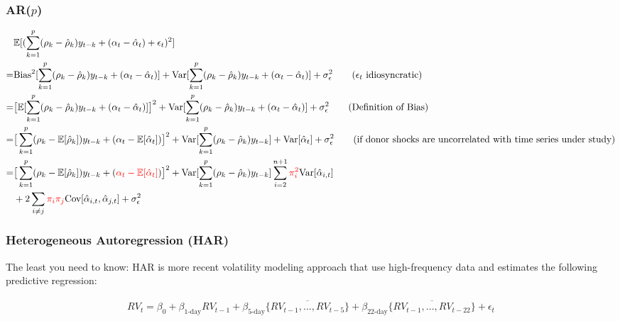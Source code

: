 \documentclass[9pt]{beamer}
\def\E{\mathbb{E}} %
\theoremstyle{definition}
\begin{document}
\begin{frame}\frametitle{AR($p$)}
      \begin{align*}
        &\E[(\sum^{p}_{k=1}(\rho_{k}-\hat\rho_{k})y_{t-k} + (\alpha_{t} - \hat{\alpha}_{t}) + \epsilon_{t} )^{2}]\notag\\
        = &\text{Bias}^{2}[\sum^{p}_{k=1}(\rho_{k}-\hat\rho_{k})y_{t-k} + (\alpha_{t} - \hat{\alpha}_{t}) ] + \text{Var}[\sum^{p}_{k=1}(\rho_{k}-\hat\rho_{k})y_{t-k} + (\alpha_{t} - \hat{\alpha}_{t}) ] + \sigma^{2}_{\epsilon}\tag{$\epsilon_{t}$ idiosyncratic}\\
        = &\big[\E[\sum^{p}_{k=1}(\rho_{k}-\hat\rho_{k})y_{t-k} + (\alpha_{t} - \hat{\alpha}_{t}) ]\big]^{2} + \text{Var}[\sum^{p}_{k=1}(\rho_{k}-\hat\rho_{k})y_{t-k} + (\alpha_{t} - \hat{\alpha}_{t})]  + \sigma^{2}_{\epsilon}\tag{Definition of Bias}\\
        = &\big[\sum^{p}_{k=1}(\rho_{k}-\E[\hat\rho_{k}])y_{t-k} + (\alpha_{t} - \E[\hat{\alpha}_{t}]) \big]^{2} + \text{Var}[\sum^{p}_{k=1}(\rho_{k}-\hat\rho_{k})y_{t-k}] + \text{Var}[\hat{\alpha}_{t}]  + \sigma^{2}_{\epsilon}\tag{if donor shocks are uncorrelated with time series under study}\\
        = &\big[\sum^{p}_{k=1}(\rho_{k}-\E[\hat\rho_{k}])y_{t-k} + (\textcolor{red}{\alpha_{t} - \E[\hat{\alpha}_{t}]}) \big]^{2} + \text{Var}[\sum^{p}_{k=1}(\rho_{k}-\hat\rho_{k})y_{t-k}] 
        \sum_{i=2}^{n+1}\textcolor{red}{\pi_{i}^{2}}\text{Var}[\hat\alpha_{i,t}] \\
        & + 2\sum_{i\neq j}\textcolor{red}{\pi_{i}\pi_{j}}\text{Cov}[\hat\alpha_{i,t},\hat\alpha_{j,t}]  + \sigma^{2}_{\epsilon}
      \end{align*}
\end{frame}

\begin{frame}
    \fontsize{8pt}{9pt}
    
    \frametitle{Heterogeneous Autoregression (HAR)}
    
    The least you need to know: HAR is more recent volatility modeling approach that use high-frequency data and estimates the following predictive regression:

    \begin{align*}
        RV_{t} = \beta_{0} + \beta_{\text{1-day}}RV_{t-1} + \beta_{\text{5-day}}\overline{\{RV_{t-1},...,RV_{t-5}\}}+\beta_{\text{22-day}}\overline{\{RV_{t-1},...,RV_{t-22}\}} + \epsilon_{t}
        \end{align*}

    \end{frame}
\end{document}
